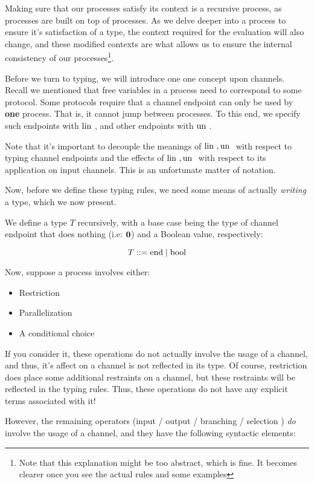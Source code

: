 Making sure that our processes satisfy its context is a recursive process, as processes are built on top of processes. As we delve deeper into a process to ensure it's satisfaction of a type, the context required for the evaluation will also change, and these modified contexts are what allows us to ensure the internal consistency of our processes\footnote{Note that this explanation might be too abstract, which is fine. It becomes clearer once you see the actual rules and some examples}.

Before we turn to typing, we will introduce one one concept upon channels. Recall we mentioned that free variables in a process need to correspond to some protocol. Some protocols require that a channel endpoint can only be used by \textbf{one} process. That is, it cannot jump between processes. To this end, we specify such endpoints with $\text{lin }$, and other endpoints with $\text{un }$.

Note that it's important to decouple the meanings of $\text{lin }, \text{un }$ with respect to typing channel endpoints and the effects of $\text{lin }, \text{un }$ with respect to its application on input channels. This is an unfortunate  matter of notation.

Now, before we define these typing rules, we need some means of actually \textit{writing} a type, which we now present.

We define a type $T$ recursively, with a base case being the type of channel endpoint that does nothing (i.e: $\textbf{0}$) and a Boolean value, respectively:

$$
T ::= \text{end} \mid \text{bool}
$$

Now, suppose a process involves either:
\begin{itemize}
    \item Restriction
    \item Parallelization
    \item A conditional choice
\end{itemize}

If you consider it, these operations do not actually involve the usage of a channel, and thus, it's affect on a channel is not reflected in its type. Of course, restriction does place some additional restraints on a channel, but these restraints will be reflected in the typing rules. Thus, these operations do not have any explicit terms associated with it!

However, the remaining operators (input / output / branching / selection ) \textit{do} involve the usage of a channel, and they have the following syntactic elements:

